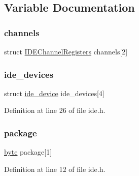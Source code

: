\subsection{Variable Documentation}
\mbox{\label{a00026_aecefa15f62cf60846ddb1a56f9153143_aecefa15f62cf60846ddb1a56f9153143}} 
\subsubsection{\texorpdfstring{channels}{channels}}
{\footnotesize\ttfamily struct \hyperlink{a00174}{I\+D\+E\+Channel\+Registers}  channels\mbox{[}2\mbox{]}}

\mbox{\label{a00026_ab97a828ed4839b575dc382e2bf826e87_ab97a828ed4839b575dc382e2bf826e87}} 
\subsubsection{\texorpdfstring{ide\+\_\+devices}{ide\_devices}}
{\footnotesize\ttfamily struct \hyperlink{a00178}{ide\+\_\+device} ide\+\_\+devices\mbox{[}4\mbox{]}}



Definition at line 26 of file ide.\+h.

\mbox{\label{a00026_a820b2230ab700e13350794494bd4a60f_a820b2230ab700e13350794494bd4a60f}} 
\subsubsection{\texorpdfstring{package}{package}}
{\footnotesize\ttfamily \hyperlink{a00116_ab8ef12fab634c171394422d0ee8baf94_ab8ef12fab634c171394422d0ee8baf94}{byte} package\mbox{[}1\mbox{]}}



Definition at line 12 of file ide.\+h.

